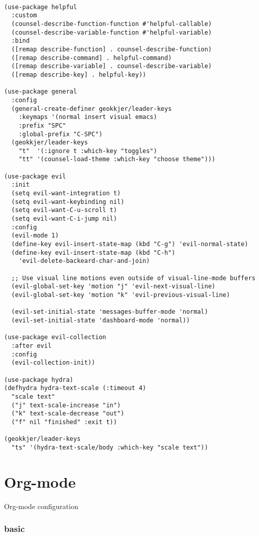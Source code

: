 \documentclass[11pt]{article}
\begin{document}
\begin{verbatim}

(use-package helpful
  :custom
  (counsel-describe-function-function #'helpful-callable)
  (counsel-describe-variable-function #'helpful-variable)
  :bind
  ([remap describe-function] . counsel-describe-function)
  ([remap describe-command] . helpful-command)
  ([remap describe-variable] . counsel-describe-variable)
  ([remap describe-key] . helpful-key))

(use-package general
  :config
  (general-create-definer geokkjer/leader-keys
    :keymaps '(normal insert visual emacs)
    :prefix "SPC"
    :global-prefix "C-SPC")
  (geokkjer/leader-keys
    "t"  '(:ignore t :which-key "toggles")
    "tt" '(counsel-load-theme :which-key "choose theme")))

(use-package evil
  :init
  (setq evil-want-integration t)
  (setq evil-want-keybinding nil)
  (setq evil-want-C-u-scroll t)
  (setq evil-want-C-i-jump nil)
  :config
  (evil-mode 1)
  (define-key evil-insert-state-map (kbd "C-g") 'evil-normal-state)
  (define-key evil-insert-state-map (kbd "C-h")
    'evil-delete-backeard-char-and-join)

  ;; Use visual line motions even outside of visual-line-mode buffers
  (evil-global-set-key 'motion "j" 'evil-next-visual-line)
  (evil-global-set-key 'motion "k" 'evil-previous-visual-line)

  (evil-set-initial-state 'messages-buffer-mode 'normal)
  (evil-set-initial-state 'dashboard-mode 'normal))

(use-package evil-collection
  :after evil
  :config
  (evil-collection-init))

(use-package hydra)
(defhydra hydra-text-scale (:timeout 4)
  "scale text"
  ("j" text-scale-increase "in")
  ("k" text-scale-decrease "out")
  ("f" nil "finished" :exit t))

(geokkjer/leader-keys
  "ts" '(hydra-text-scale/body :which-key "scale text"))

\end{verbatim}

\section{Org-mode}
\label{sec:org3fc324f}

Org-mode configuration

\subsubsection{basic}
\label{sec:org49fbb8d}
\end{document}
